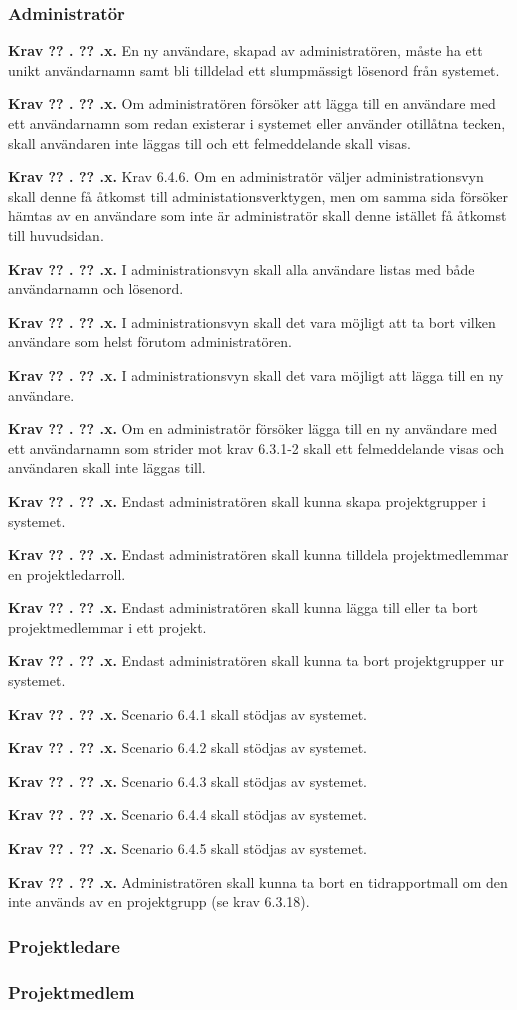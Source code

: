\documentclass[a4paper]{article}
\newcommand\getcurrentref[1]{%
 \ifnumequal{\value{#1}}{0}
  {??}
  {\the\value{#1}}%
}
\newcommand\requirement[2]{
	\numberedrow{Krav}{#1}{#2}
}
\newcommand\numberedrow[3]{
	\noindent
	\textbf{#1 \getcurrentref{section}.\getcurrentref{subsection}.#2.} #3
	
}
\begin{document}
		\subsubsection*{Administratör}
			\requirement{x}{En ny användare, skapad av administratören, måste ha ett unikt användarnamn samt bli tilldelad ett slumpmässigt lösenord från systemet.}
			\requirement{x}{Om administratören försöker att lägga till en användare med ett användarnamn som redan existerar i systemet eller använder otillåtna tecken, skall användaren inte läggas till och ett felmeddelande skall visas.}
			\requirement{x}{Krav 6.4.6. Om en administratör väljer administrationsvyn skall denne få åtkomst till administationsverktygen, men om samma sida försöker hämtas av en användare som inte är administratör skall denne istället få åtkomst till huvudsidan.}
			\requirement{x}{I administrationsvyn skall alla användare listas med både användarnamn och lösenord.}
			\requirement{x}{I administrationsvyn skall det vara möjligt att ta bort vilken användare som helst förutom administratören.}
			\requirement{x}{I administrationsvyn skall det vara möjligt att lägga till en ny användare.}
			\requirement{x}{Om en administratör försöker lägga till en ny användare med ett användarnamn som strider mot krav 6.3.1-2 skall ett felmeddelande visas och användaren skall inte läggas till.}
			\requirement{x}{Endast administratören skall kunna skapa projektgrupper i systemet.}
			\requirement{x}{Endast administratören skall kunna tilldela projektmedlemmar en projektledarroll.}
			\requirement{x}{Endast administratören skall kunna lägga till eller ta bort projektmedlemmar i ett projekt. }
			\requirement{x}{Endast administratören skall kunna ta bort projektgrupper ur systemet.}
			\requirement{x}{Scenario 6.4.1 skall stödjas av systemet.}
			\requirement{x}{Scenario 6.4.2 skall stödjas av systemet.}
			\requirement{x}{Scenario 6.4.3 skall stödjas av systemet.}
			\requirement{x}{Scenario 6.4.4 skall stödjas av systemet.}
			\requirement{x}{Scenario 6.4.5 skall stödjas av systemet.}
			\requirement{x}{Administratören skall kunna ta bort en tidrapportmall om den inte används av en projektgrupp (se krav 6.3.18).}

		\subsubsection*{Projektledare}
		\subsubsection*{Projektmedlem}
		
\end{document}
